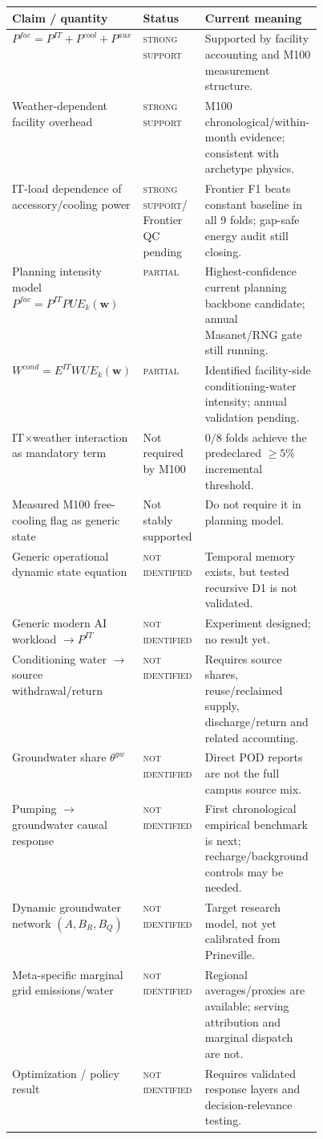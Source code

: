 \documentclass[11pt]{article}
\newcommand{\NotIdentified}{\textsc{not identified}}
\newcommand{\Strong}{\textsc{strong support}}
\newcommand{\Partial}{\textsc{partial}}
\begin{document}
\begin{center}
\scriptsize
\begin{tabularx}{\linewidth}{@{}p{0.25\linewidth}p{0.20\linewidth}Y@{}}
\toprule
\textbf{Claim / quantity} & \textbf{Status} & \textbf{Current meaning} \\
\midrule
$P^{fac}=P^{IT}+P^{cool}+P^{aux}$ & \Strong & Supported by facility accounting and M100 measurement structure. \\
Weather-dependent facility overhead & \Strong & M100 chronological/within-month evidence; consistent with archetype physics. \\
IT-load dependence of accessory/cooling power & \Strong / Frontier QC pending & Frontier F1 beats constant baseline in all 9 folds; gap-safe energy audit still closing. \\
Planning intensity model $P^{fac}=P^{IT}PUE_k(\mathbf w)$ & \Partial & Highest-confidence current planning backbone candidate; annual Masanet/RNG gate still running. \\
$W^{cond}=E^{IT}WUE_k(\mathbf w)$ & \Partial & Identified facility-side conditioning-water intensity; annual validation pending. \\
IT$\times$weather interaction as mandatory term & Not required by M100 & $0/8$ folds achieve the predeclared $\ge5\%$ incremental threshold. \\
Measured M100 free-cooling flag as generic state & Not stably supported & Do not require it in planning model. \\
Generic operational dynamic state equation & \NotIdentified & Temporal memory exists, but tested recursive D1 is not validated. \\
Generic modern AI workload $\rightarrow P^{IT}$ & \NotIdentified & Experiment designed; no result yet. \\
Conditioning water $\rightarrow$ source withdrawal/return & \NotIdentified & Requires source shares, reuse/reclaimed supply, discharge/return and related accounting. \\
Groundwater share $\theta^{gw}$ & \NotIdentified & Direct POD reports are not the full campus source mix. \\
Pumping $\rightarrow$ groundwater causal response & \NotIdentified & First chronological empirical benchmark is next; recharge/background controls may be needed. \\
Dynamic groundwater network $(A,B_R,B_Q)$ & \NotIdentified & Target research model, not yet calibrated from Prineville. \\
Meta-specific marginal grid emissions/water & \NotIdentified & Regional averages/proxies are available; serving attribution and marginal dispatch are not. \\
Optimization / policy result & \NotIdentified & Requires validated response layers and decision-relevance testing. \\
\bottomrule
\end{tabularx}
\end{center}
\end{document}
